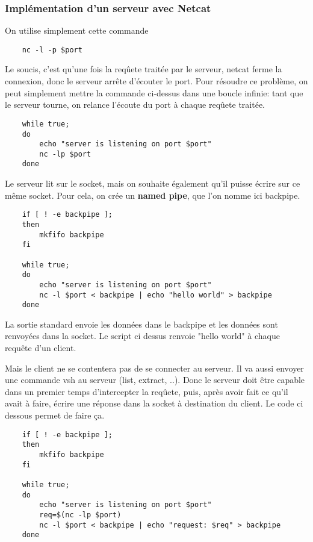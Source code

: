 \documentclass[titlepage]{article}
\begin{document}
	\subsubsection{Implémentation d'un serveur avec Netcat}

	On utilise simplement cette commande
	\begin{lstlisting}
	nc -l -p $port
	\end{lstlisting}

	Le soucis, c'est qu'une fois la reqûete traitée par le serveur, netcat ferme la connexion, donc le serveur arrête d'écouter le port. Pour résoudre ce problème, on peut simplement mettre la commande ci-dessus dans une boucle infinie: tant que le serveur tourne, on relance l'écoute du port à chaque reqûete traitée.
	\begin{lstlisting}
	while true;
	do
		echo "server is listening on port $port"
		nc -lp $port
	done
	\end{lstlisting}

	Le serveur lit sur le socket, mais on souhaite également qu'il puisse écrire sur ce même socket. Pour cela, on crée un \textbf{named pipe}, que l'on nomme ici backpipe.
	\begin{lstlisting}
	if [ ! -e backpipe ];
	then
	    mkfifo backpipe
	fi

	while true;
	do
	    echo "server is listening on port $port"
	    nc -l $port < backpipe | echo "hello world" > backpipe
	done
	\end{lstlisting}

	La sortie standard envoie les données dans le backpipe et les données sont renvoyées dans la socket.
	Le script ci dessus renvoie "hello world" à chaque requête d'un client.

	Mais le client ne se contentera pas de se connecter au serveur. Il va aussi envoyer une commande vsh au serveur (list, extract, ..). Donc le serveur doit être capable dans un premier temps d'intercepter la reqûete, puis, après avoir fait ce qu'il avait à faire, écrire une réponse dans la socket à destination du client. Le code ci dessous permet de faire ça. 

	\begin{lstlisting}
	if [ ! -e backpipe ];
	then
	    mkfifo backpipe
	fi

	while true;
	do
	    echo "server is listening on port $port"
	    req=$(nc -lp $port)
	    nc -l $port < backpipe | echo "request: $req" > backpipe
	done
	\end{lstlisting}
\end{document}
